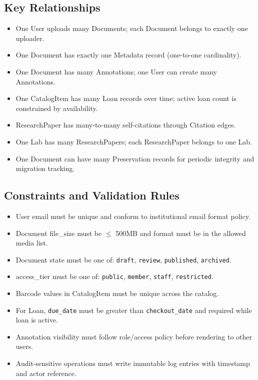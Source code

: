 \documentclass[12pt,a4paper]{article}
\begin{document}
\subsection*{Key Relationships}
\begin{itemize}
    \item One User uploads many Documents; each Document belongs to exactly one uploader.
    \item One Document has exactly one Metadata record (one-to-one cardinality).
    \item One Document has many Annotations; one User can create many Annotations.
    \item One CatalogItem has many Loan records over time; active loan count is constrained by availability.
    \item ResearchPaper has many-to-many self-citations through Citation edges.
    \item One Lab has many ResearchPapers; each ResearchPaper belongs to one Lab.
    \item One Document can have many Preservation records for periodic integrity and migration tracking.
\end{itemize}

\subsection*{Constraints and Validation Rules}
\begin{itemize}
    \item User email must be unique and conform to institutional email format policy.
    \item Document file\_size must be $\leq$ 500MB and format must be in the allowed media list.
    \item Document state must be one of: \texttt{draft}, \texttt{review}, \texttt{published}, \texttt{archived}.
    \item access\_tier must be one of: \texttt{public}, \texttt{member}, \texttt{staff}, \texttt{restricted}.
    \item Barcode values in CatalogItem must be unique across the catalog.
    \item For Loan, \texttt{due\_date} must be greater than \texttt{checkout\_date} and required while loan is active.
    \item Annotation visibility must follow role/access policy before rendering to other users.
    \item Audit-sensitive operations must write immutable log entries with timestamp and actor reference.
\end{itemize}
\end{document}
